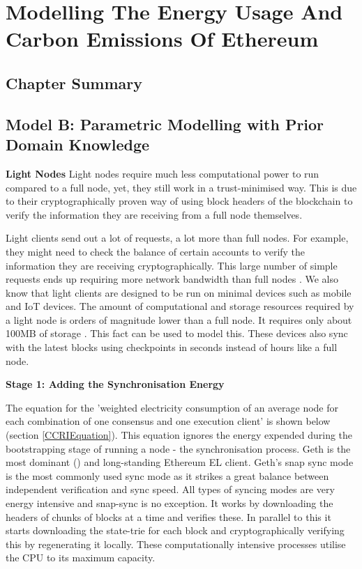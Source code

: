 \chapter{Modelling The Energy Usage And Carbon Emissions Of Ethereum}
\label{Modelling}

\section{Chapter Summary}


\section{Model B: Parametric Modelling with Prior Domain Knowledge}

\textbf{Light Nodes}
Light nodes require much less computational power to run compared to a full node, yet, they still work in a trust-minimised way. This is due to their cryptographically proven way of using block headers of the blockchain to verify the information they are receiving from a full 
node themselves. 

Light clients send out a lot of requests, a lot more than full nodes. For example, they might need to check the balance of certain accounts to verify the information they are receiving cryptographically. This large number of simple requests ends up requiring more network bandwidth than full nodes \cite{WhatTechnologies}. We also know that light clients are designed to be run on minimal devices such as mobile and IoT devices. The amount of computational and storage resources required by a light node is orders of magnitude lower than a full node. It requires only about 100MB of storage \cite{WhatTechnologies}. This fact can be used to model this. These devices also sync with the latest blocks using checkpoints in seconds instead of hours like a full node.

\textbf{Stage 1: Adding the Synchronisation Energy} 

 The equation for the 'weighted  electricity  consumption  of  an  average  node for each combination of one consensus and one execution client' is shown below (section \ref{CCRIEquation}). This equation ignores the energy expended during the bootstrapping stage of running a node - the synchronisation process. Geth is the most dominant () and long-standing Ethereum EL client. Geth's snap sync mode is the most commonly used sync mode as it strikes a great balance between independent verification and sync speed.
 All types of syncing modes are very energy intensive and snap-sync is no exception. It works by downloading the headers of chunks of blocks at a time and verifies these. In parallel to this it starts downloading the state-trie for each block and cryptographically verifying this by regenerating it locally. These computationally intensive processes utilise the CPU to its maximum capacity.

